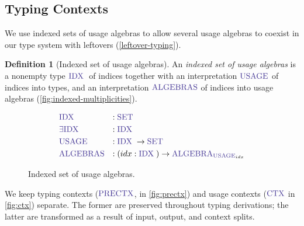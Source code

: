 \documentclass[a4paper,UKenglish,cleveref,autoref,thm-restate,authorcolumns]{lipics-v2019}
\theoremstyle{definition}
\newtheorem{nidefinition}{Definition}
\newcommand{\type}[1]{\textcolor{BlueViolet}{\operatorname{#1}}}
\newcommand{\Set}{\type{SET}}
\newcommand{\PreCtx}{\type{PRECTX}}
\newcommand{\Ctx}{\type{CTX}}
\newcommand{\Idx}{\type{IDX}\;}
\newcommand{\Usage}{\type{USAGE}}
\newcommand{\Algebra}{\type{ALGEBRA}}
\begin{document}
\subsection{Typing Contexts}
\label{contexts}

We use indexed sets of usage algebras to allow several usage algebras to coexist in our type system with leftovers (\autoref{leftover-typing}).
\begin{nidefinition}[Indexed set of usage algebras]
  An \emph{indexed set of usage algebras} is a nonempty type $\Idx$ of indices together with an interpretation $\Usage$ of indices into types, and an interpretation $\type{ALGEBRAS}$ of indices into usage algebras (\autoref{fig:indexed-multiplicities}).
  \begin{figure}[h]
    \begin{equation*}
      \begin{split}
        &\Idx               &:{} &\Set \\
        &\type{\exists IDX} &:{} &\Idx \\
        &\Usage             &:{} &\Idx \to \Set \\
        &\type{ALGEBRAS}    &:{} &(idx : \Idx) \to \Algebra_{\Usage_{idx}}
      \end{split}
    \end{equation*}
    \caption{Indexed set of usage algebras.}
    \label{fig:indexed-multiplicities}
  \end{figure}
\end{nidefinition}

We keep typing contexts ($\PreCtx$, in \autoref{fig:prectx}) and usage contexts ($\Ctx$ in \autoref{fig:ctx}) separate.
The former are preserved throughout typing derivations; the latter are transformed as a result of input, output, and context splits.
\end{document}
